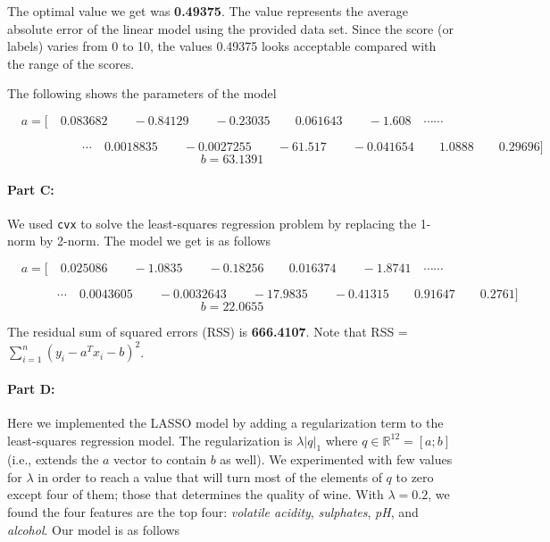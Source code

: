 The optimal value we get was \textbf{0.49375}. The value represents the average absolute error of the linear model using the provided data set. Since the score (or labels) varies from 0 to 10, the values 0.49375 looks acceptable compared with the range of the scores.

The following shows the parameters of the model
\begin{footnotesize}
\mathleft
\[
a= \text{[}\quad 0.083682\qquad -0.84129\qquad -0.23035\qquad 0.061643\qquad -1.608 \quad \cdots\cdots
\]

\[
\qquad \qquad \qquad \cdots \quad 0.0018835\qquad -0.0027255\qquad -61.517\qquad -0.041654\qquad 1.0888\qquad 0.29696 \text{]}
\]
\[
b = 63.1391
\]
\end{footnotesize}


\paragraph{Part C:}
We used \texttt{cvx} to solve the least-squares regression problem by replacing the 1-norm by 2-norm. The model we get is as follows 
\begin{footnotesize}
\mathleft
\[
a= \text{[}\quad 0.025086 \qquad -1.0835 \qquad -0.18256 \qquad 0.016374 \qquad -1.8741\quad \cdots\cdots
\]

\[
\qquad \qquad  \cdots \quad 0.0043605 \qquad -0.0032643 \qquad -17.9835 \qquad -0.41315 \qquad 0.91647 \qquad 0.2761  \text{]}
\]
\[
b = 22.0655
\]
\end{footnotesize}
The residual sum of squared errors (RSS) is \textbf{666.4107}. Note that  RSS = $\sum_{i=1}^{n}(y_{i}-a^{T}x_{i}-b)^{2}$.  %

\paragraph{Part D:}
Here we implemented the LASSO model by adding a regularization term to the least-squares regression model. The regularization is $\lambda |q|_{1}$ where $q\in \mathbb{R}^12 = [a;b]$ (i.e., extends the $a$ vector to contain $b$ as well). We experimented with few values for $\lambda$ in order to reach a value that will turn most of the elements of $q$ to zero except four of them; those that determines the quality of wine. With $\lambda = 0.2$, we found the four features are the top four: \emph{volatile acidity}, \emph{sulphates}, \emph{pH}, and \emph{alcohol}. Our model is as follows 


